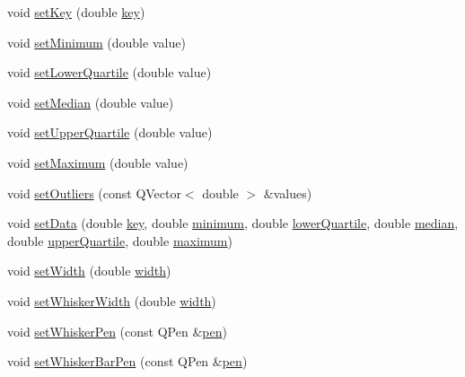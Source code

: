 \begin{DoxyCompactItemize}
\item 
void \hyperlink{classQCPStatisticalBox_a84a1c6d34b2f9af40bca0c527d51e97e}{set\+Key} (double \hyperlink{classQCPStatisticalBox_a767af754f39872d6308b900a0d1758ca}{key})
\item 
void \hyperlink{classQCPStatisticalBox_a84ff7cc61ba44890f0c3e0c99c19941e}{set\+Minimum} (double value)
\item 
void \hyperlink{classQCPStatisticalBox_a680941af5e23d902013962fa67223f9e}{set\+Lower\+Quartile} (double value)
\item 
void \hyperlink{classQCPStatisticalBox_a65970e77a897da4ecb4b15300868aad3}{set\+Median} (double value)
\item 
void \hyperlink{classQCPStatisticalBox_a65a1375f941c5a2077b5201229e89346}{set\+Upper\+Quartile} (double value)
\item 
void \hyperlink{classQCPStatisticalBox_acec5ad1901f00f2c5387cfb4d9787eb3}{set\+Maximum} (double value)
\item 
void \hyperlink{classQCPStatisticalBox_af9bc09620e0bf93bf444ee35e5800d1d}{set\+Outliers} (const Q\+Vector$<$ double $>$ \&values)
\item 
void \hyperlink{classQCPStatisticalBox_adf50c57b635edb12470c0e4a986aff37}{set\+Data} (double \hyperlink{classQCPStatisticalBox_a767af754f39872d6308b900a0d1758ca}{key}, double \hyperlink{classQCPStatisticalBox_acd94c05d59c05d9146d3b60d9f52df82}{minimum}, double \hyperlink{classQCPStatisticalBox_af9c4a98f5ca95b5a5a8b140f57b64ace}{lower\+Quartile}, double \hyperlink{classQCPStatisticalBox_a44abdee617fe0bca72e6a2ea3fd492de}{median}, double \hyperlink{classQCPStatisticalBox_abd15951907b54343a89b1f7feddcb7a7}{upper\+Quartile}, double \hyperlink{classQCPStatisticalBox_a928bcf07dd2176affad91d85be03172f}{maximum})
\item 
void \hyperlink{classQCPStatisticalBox_a0b62775bd67301b1eba5c785f2b26f14}{set\+Width} (double \hyperlink{classQCPStatisticalBox_a0733a7bd575fc5929ce6d507bcc2a04c}{width})
\item 
void \hyperlink{classQCPStatisticalBox_adf378812446bd66f34d1f7f293d991cd}{set\+Whisker\+Width} (double \hyperlink{classQCPStatisticalBox_a0733a7bd575fc5929ce6d507bcc2a04c}{width})
\item 
void \hyperlink{classQCPStatisticalBox_a4a5034cb3b9b040444df05ab1684620b}{set\+Whisker\+Pen} (const Q\+Pen \&\hyperlink{classQCPAbstractPlottable_a41d060007cc6b3037c9c04d22d0c0398}{pen})
\item 
void \hyperlink{classQCPStatisticalBox_aa8d3e503897788e1abf68dc74b5f147f}{set\+Whisker\+Bar\+Pen} (const Q\+Pen \&\hyperlink{classQCPAbstractPlottable_a41d060007cc6b3037c9c04d22d0c0398}{pen})

\end{DoxyCompactItemize}
